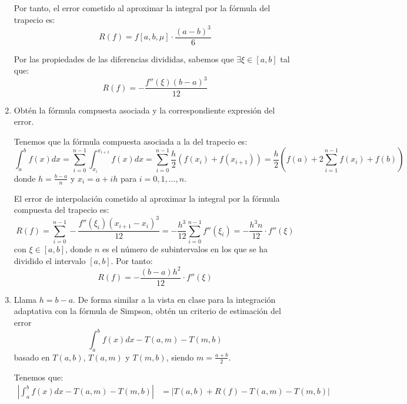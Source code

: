 \begin{ejercicio}
\begin{enumerate}
        Por tanto, el error cometido al aproximar la integral por la fórmula del trapecio es:
        \begin{equation*}
            R(f) = f[a,b,\mu]\cdot \dfrac{(a-b)^3}{6}
        \end{equation*}

        Por las propiedades de las diferencias divididas, sabemos que $\exists \xi\in [a,b]$ tal que:
        \begin{equation*}
            R(f) = -\dfrac{f''(\xi)(b-a)^3}{12}
        \end{equation*}
        \item Obtén la fórmula compuesta asociada y la correspondiente expresión del error.
        
        Tenemos que la fórmula compuesta asociada a la del trapecio es:
        \begin{equation*}
            \int_{a}^{b} f(x) dx = \sum_{i=0}^{n-1}\int_{x_i}^{x_{i+1}} f(x) dx = \sum_{i=0}^{n-1} \dfrac{h}{2}\left(f(x_i) + f(x_{i+1})\right)
            = \dfrac{h}{2}\left(f(a) + 2\sum_{i=1}^{n-1} f(x_i) + f(b)\right)
        \end{equation*}
        donde $h = \frac{b-a}{n}$ y $x_i = a + ih$ para $i=0,1,\ldots,n$.

        El error de interpolación cometido al aproximar la integral por la fórmula compuesta del trapecio es:
        \begin{equation*}
            R(f) = \sum_{i=0}^{n-1} -\dfrac{f''(\xi_i)(x_{i+1}-x_i)^3}{12} = -\dfrac{h^3}{12}\sum_{i=0}^{n-1} f''(\xi_i)
            = -\dfrac{h^3n}{12}\cdot f''(\xi)
        \end{equation*}
        con $\xi\in [a,b]$, donde $n$ es el número de subintervalos en los que se ha dividido el intervalo $[a,b]$. Por tanto:
        \begin{equation*}
            R(f) = -\dfrac{(b-a)h^2}{12}\cdot f''(\xi)
        \end{equation*}
        \item Llama $h = b - a$. De forma similar a la vista en clase para la integración adaptativa con la fórmula de Simpson, obtén un criterio de estimación del error
        \begin{equation*}
            \int_{a}^{b} f(x) dx - T(a, m) - T(m, b)
        \end{equation*}
        basado en $T(a, b)$, $T(a, m)$ y $T(m, b)$, siendo $m = \frac{a+b}{2}$.


        Tenemos que:
        \begin{align*}
            \left|\int_{a}^{b} f(x) dx - T(a, m) - T(m, b)\right| &= \left|T(a, b) + R(f) - T(a, m) - T(m, b)\right|
        \end{align*}


\end{enumerate}
\end{ejercicio}
